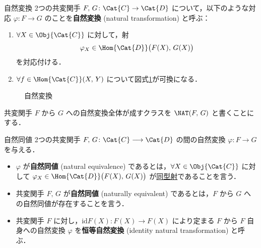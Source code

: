 \documentclass[algtopo_main]{subfiles}
\begin{document}
\begin{mydef}[label=def:nat]{自然変換}
    2つの共変関手 $F,\, G \colon \Cat{C} \to \Cat{D}$ について，以下のような対応 $\varphi \colon F \to G$ のことを\textbf{自然変換} (natural transformation) と呼ぶ：
    \begin{enumerate}
        \item $\forall X \in \Obj{\Cat{C}}$ に対して，射
        \begin{align}
            \varphi_X \in \Hom{\Cat{D}} \bigl( F(X),\, G(X) \bigr) 
        \end{align}
        を対応付ける．
        \item $\forall f \in \Hom{\Cat{C}} (X,\, Y)$ について図式\ref{fig:nat}が可換になる．
    \end{enumerate}
\end{mydef}

\begin{figure}[H]
    \centering
    \caption{自然変換}
    \label{fig:nat}
\end{figure}%

共変関手 $F$ から $G$ への自然変換全体が成すクラスを $\NAT(F,\, G)$ と書くことにする．

\begin{mydef}[label=def:naturallyeq]{自然同値}
    2つの共変関手 $F,\, G \colon \Cat{C} \longrightarrow \Cat{D}$ の間の自然変換 $\varphi \colon F \longrightarrow G$ を与える．
    \begin{itemize}
        \item $\varphi$ が\textbf{自然同値} (natural equivalence) であるとは，$\forall X \in \Obj{\Cat{C}}$ に対して $\varphi_X \in \Hom{\Cat{D}} \bigl( F(X),\, G(X) \bigr)$ が\hyperref[def:isomorphism]{同型射}であることを言う．
        \item 共変関手 $F,\, G$ が\textbf{自然同値} (naturally equivalent) であるとは，$F$ から $G$ への自然同値が存在することを言う．
        \item 共変関手 $F$ に対し，$\mathrm{id}{F(X)} \colon F(X) \longrightarrow F(X)$ により定まる $F$ から $F$ 自身への自然変換 $\varphi$ を\textbf{恒等自然変換} (identity natural transformation) と呼ぶ．
    \end{itemize}
\end{mydef}
\end{document}
